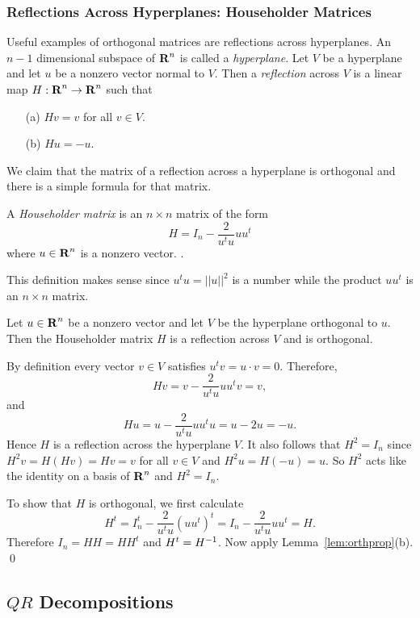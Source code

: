 \subsubsection*{Reflections Across Hyperplanes: Householder Matrices}

Useful examples of orthogonal matrices are reflections across
hyperplanes.  An $n-1$ dimensional subspace of $\mbox{$\bf{R}$}^n$ is called a
{\em hyperplane\/}.  Let $V$ be a hyperplane and let $u$
be a nonzero vector normal to $V$.  Then a
{\em reflection\/} across $V$ is
a linear map $H:\mbox{$\bf{R}$}^n\to\mbox{$\bf{R}$}^n$ such that
\begin{itemize}
\item[(a)] $Hv=v$ for all $v\in V$.
\item[(b)] $Hu = -u$.
\end{itemize}
We claim that the matrix of a reflection across a hyperplane is orthogonal
and there is a simple formula for that matrix.
\begin{Def} \label{D:Householder}
A {\em Householder matrix\/} is an $n\times n$ matrix of the form
\begin{equation} \label{eq:householder}
H=I_n - \frac{2}{u^tu} u u^t
\end{equation}
where $u\in\mbox{$\bf{R}$}^n$ is a nonzero vector. .
\end{Def}
This definition makes sense since $u^tu=||u||^2$ is a number while the
product $u u^t$ is an $n\times n$ matrix.

\begin{lemma}
Let $u\in\mbox{$\bf{R}$}^n$ be a nonzero vector and let $V$ be the hyperplane orthogonal
to $u$.  Then the Householder matrix $H$ is a
reflection across $V$ and is orthogonal.
\end{lemma}

\proof
By definition every vector $v\in V$ satisfies $u^tv=u\cdot v =0$.  Therefore,
\[
Hv = v - \frac{2}{u^tu} u u^tv = v,
\]
and
\[
Hu = u - \frac{2}{u^tu} u u^tu =  u-2u = -u.
\]
Hence $H$ is a reflection across the hyperplane $V$.  It also follows that
$H^2=I_n$ since $H^2v = H(Hv) = Hv = v$ for all $v\in V$ and $H^2u=H(-u)=u$.
So $H^2$ acts like the identity on a basis of $\mbox{$\bf{R}$}^n$ and $H^2=I_n$.

To show that $H$ is orthogonal, we first calculate
\[
H^t = I_n^t - \frac{2}{u^tu} (uu^t)^t= I_n - \frac{2}{u^tu}uu^t = H.
\]
Therefore $I_n = H H = HH^t$ and $H^t=H^{-1}$.  Now apply
Lemma~\ref{lem:orthprop}(b).   \qed

\subsection*{$QR$ Decompositions}

